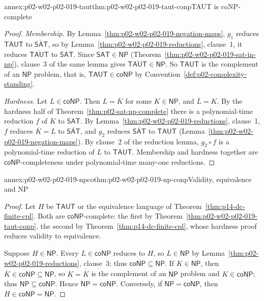 \begin{annexitem}{annex:p02-w02-p02-019-taut}{thm:p02-w02-p02-019-taut-conp}{TAUT is coNP-complete}
\begin{proof}
\emph{Membership.}  By Lemma~\ref{thm:p02-w02-p02-019-negation-maps}, \(g_1\)
reduces \(\mathsf{TAUT}\) to \(\overline{\mathsf{SAT}}\), so by
Lemma~\ref{thm:p02-w02-p02-019-reductions}, clause~1, it reduces
\(\overline{\mathsf{TAUT}}\) to \(\mathsf{SAT}\).  Since
\(\mathsf{SAT}\in\mathsf{NP}\) (Theorem~\ref{thm:p02-w02-p02-019-sat-in-np}),
clause~3 of the same lemma gives \(\overline{\mathsf{TAUT}}\in\mathsf{NP}\).
So \(\mathsf{TAUT}\) is the complement of an \(\mathsf{NP}\) problem, that is,
\(\mathsf{TAUT}\in\mathsf{coNP}\) by Convention~\ref{def:p02-complexity-standing}.

\emph{Hardness.}  Let \(L\in\mathsf{coNP}\).  Then \(L=\overline K\) for some
\(K\in\mathsf{NP}\), and \(\overline L=K\).  By the hardness half of
Theorem~\ref{thm:p02-sat-np-complete} there is a polynomial-time reduction
\(f\) of \(K\) to \(\mathsf{SAT}\).  By
Lemma~\ref{thm:p02-w02-p02-019-reductions}, clause~1, \(f\) reduces
\(\overline K=L\) to \(\overline{\mathsf{SAT}}\), and \(g_2\) reduces
\(\overline{\mathsf{SAT}}\) to \(\mathsf{TAUT}\)
(Lemma~\ref{thm:p02-w02-p02-019-negation-maps}).  By clause~2 of the
reduction lemma, \(g_2\circ f\) is a polynomial-time reduction of \(L\) to
\(\mathsf{TAUT}\).  Membership and hardness together are
\(\mathsf{coNP}\)-completeness under polynomial-time many-one reductions.
\end{proof}
\end{annexitem}

\begin{annexitem}{annex:p02-w02-p02-019-npco}{thm:p02-w02-p02-019-np-conp}{Validity, equivalence and NP}
\begin{proof}
Let \(H\) be \(\mathsf{TAUT}\) or the equivalence language of
Theorem~\ref{thm:p14-dc-finite-cpl}.  Both are \(\mathsf{coNP}\)-complete:
the first by Theorem~\ref{thm:p02-w02-p02-019-taut-conp}, the second by
Theorem~\ref{thm:p14-dc-finite-cpl}, whose hardness proof reduces validity to
equivalence.

Suppose \(H\in\mathsf{NP}\).  Every \(L\in\mathsf{coNP}\) reduces to \(H\), so
\(L\in\mathsf{NP}\) by Lemma~\ref{thm:p02-w02-p02-019-reductions}, clause~3;
thus \(\mathsf{coNP}\subseteq\mathsf{NP}\).  If \(K\in\mathsf{NP}\), then
\(\overline K\in\mathsf{coNP}\subseteq\mathsf{NP}\), so
\(K=\overline{\overline K}\) is the complement of an \(\mathsf{NP}\) problem
and \(K\in\mathsf{coNP}\); thus \(\mathsf{NP}\subseteq\mathsf{coNP}\).  Hence
\(\mathsf{NP}=\mathsf{coNP}\).  Conversely, if \(\mathsf{NP}=\mathsf{coNP}\),
then \(H\in\mathsf{coNP}=\mathsf{NP}\).
\end{proof}
\end{annexitem}
